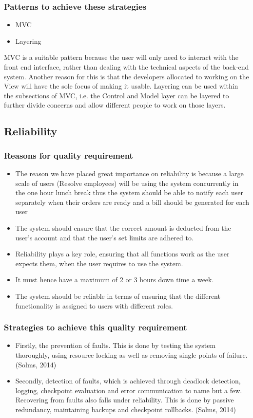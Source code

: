 \documentclass[a4paper,12pt]{article}
\begin{document}
 \subsubsection{Patterns to achieve these strategies}
 \begin{itemize}
 \item MVC
 \item Layering
\end{itemize}
MVC is a suitable pattern because the user will only need to interact with the front end interface, rather than dealing with the technical aspects of the back-end system. Another reason for this is that the developers allocated to working on the View will have the sole focus of making it usable.
Layering can be used within the subsections of MVC, i.e. the Control and Model layer can be layered to further divide concerns and allow different people to work on those layers.

\subsection{Reliability}
\subsubsection{Reasons for quality requirement}
	\begin{itemize}
	\item The reason we have placed great importance on reliability is because a large scale of users (Resolve employees) will be using the system concurrently in the one hour lunch break thus the system should be able to notify each user separately when their orders are ready and a bill should be generated for each user
	\item The system should ensure that the correct amount is deducted from the user's account and that the user's set limits are adhered to.
	\item Reliability plays a key role, ensuring that all functions work as the user expects them, when the user requires to use the system.
	\item It must hence have a maximum of 2 or 3 hours down time a week.
	\item The system should be reliable in terms of ensuring that the different functionality is assigned to users with different roles.  
	\end{itemize}
	\subsubsection{Strategies to achieve this quality requirement}
	\begin{itemize}
	\item Firstly, the prevention of faults. This is done by testing the system thoroughly, using resource locking as well as removing single points of failure. (Solms, 2014)
 \item Secondly, detection of faults, which is achieved through deadlock detection, logging, checkpoint evaluation and error communication to name but a few. Recovering from faults also falls under reliability. This is done by passive redundancy, maintaining backups and checkpoint rollbacks. (Solms, 2014)
 \end{itemize}
\end{document}
